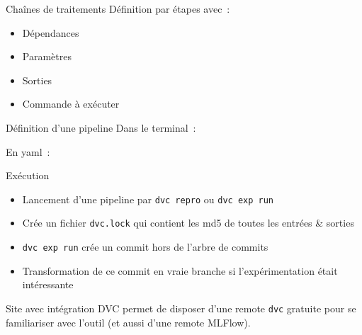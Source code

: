 \begin{frame}{Chaînes de traitements}
  Définition par étapes avec~:
  \begin{itemize}
    \item Dépendances
    \item Paramètres
    \item Sorties
    \item Commande à exécuter
  \end{itemize}

\end{frame}

\begin{frame}{Définition d'une pipeline}
  Dans le terminal~:


  En yaml~:

\end{frame}

\begin{frame}{Exécution}
  \begin{itemize}
    \item Lancement d'une pipeline par \texttt{dvc repro} ou \texttt{dvc exp run}
    \item Crée un fichier \texttt{dvc.lock} qui contient les md5 de toutes les entrées \& sorties
    \item \texttt{dvc exp run} crée un commit hors de l'arbre de commits
    \item Transformation de ce commit en vraie branche si l'expérimentation était intéressante
  \end{itemize}
\end{frame}

\begin{frame}{Site avec intégration DVC}
   permet de disposer d'une remote \texttt{dvc} gratuite pour se familiariser avec l'outil (et aussi d'une remote MLFlow).
\end{frame}
